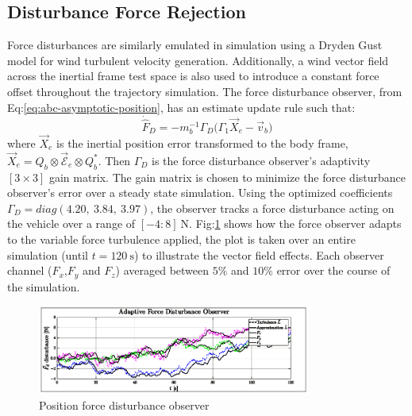\subsection{Disturbance Force Rejection}
\label{subsec:simulation.disturbance.force}
Force disturbances are similarly emulated in simulation using a Dryden Gust model for wind turbulent velocity generation. Additionally, a wind vector field across the inertial frame test space is also used to introduce a constant force offset throughout the trajectory simulation. The force disturbance observer, from Eq:\ref{eq:abc-asymptotic-position}, has an estimate update rule such that:
\begin{equation}
\dot{\hat{F}}_D=-m_b^{-1}\Gamma_D\Big(\Gamma_1\vec{X}_e-\vec{v}_b\Big)
\end{equation}
where $\vec{X}_e$ is the inertial position error transformed to the body frame, $\vec{X}_e=Q_b\otimes\vec{\mathcal{E}}_e\otimes Q_b^*$. Then $\Gamma_D$ is the force disturbance observer's adaptivity $[3\times 3]$ gain matrix. The gain matrix is chosen to minimize the force disturbance observer's error over a steady state simulation. Using the optimized coefficients $\Gamma_D=diag(4.20,~3.84,~3.97)$, the observer tracks a force disturbance acting on the vehicle over a range of $[-4:8]~\text{N}$. Fig:\ref{fig:force-observer} shows how the force observer adapts to the variable force turbulence applied, the plot is taken over an entire simulation (until $t=120~\text{s}$) to illustrate the vector field effects. Each observer channel ($F_x$,$F_y$ and $F_z$) averaged between $5\%$ and $10\%$ error over the course of the simulation.
\begin{figure}[hbtp]
\vspace{-6pt}
\centering
\includegraphics[width=0.8\textwidth]{graphs/force-observer}
\vspace{-10pt}
\caption{Position force disturbance observer}
\label{fig:force-observer}
\vspace{-18pt}
\end{figure}
\par
